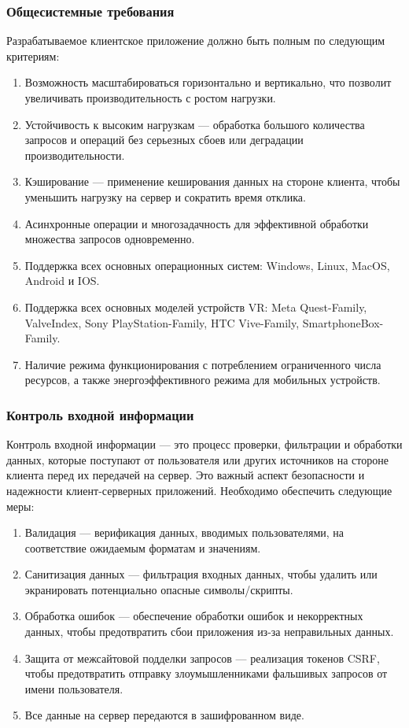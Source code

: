 \documentclass[a4paper,14pt]{extarticle}
\begin{document}
\begin{spacing}{1.5}
\subsubsection{Общесистемные требования}
\hspace{\parindent} Разрабатываемое клиентское приложение должно быть полным по следующим критериям:
\begin{enumerate}[label*=\arabic*.]
    \item Возможность масштабироваться горизонтально и вертикально, что позволит увеличивать производительность с ростом нагрузки.
    \item Устойчивость к высоким нагрузкам --- обработка большого количества запросов и операций без серьезных сбоев или деградации производительности.
    \item Кэширование --- применение кеширования данных на стороне клиента, чтобы уменьшить нагрузку на сервер и сократить время отклика.
    \item Асинхронные операции и многозадачность для эффективной обработки множества запросов одновременно.
    \item Поддержка всех основных операционных систем: Windows, Linux, MacOS, Android и IOS.
    \item {\color{RoyalBlue}Поддержка всех основных моделей устройств VR: Meta Quest-Family, ValveIndex, Sony PlayStation-Family, HTC Vive-Family, SmartphoneBox-Family.}
    \item Наличие режима функционирования с потреблением ограниченного числа ресурсов, а также энергоэффективного режима для мобильных устройств.
\end{enumerate}

\subsubsection{Контроль входной информации}
\hspace{\parindent} Контроль входной информации --- это процесс проверки, фильтрации и обработки данных, которые поступают от пользователя или других источников на стороне клиента перед их передачей на сервер. Это важный аспект безопасности и надежности клиент-серверных приложений. Необходимо обеспечить следующие меры:
\begin{enumerate}[label*=\arabic*.]
    \item Валидация --- верификация данных, вводимых пользователями, на соответствие ожидаемым форматам и значениям.
    \item Санитизация данных --- фильтрация входных данных, чтобы удалить или экранировать потенциально опасные символы/скрипты.
    \item Обработка ошибок --- обеспечение обработки ошибок и некорректных данных, чтобы предотвратить сбои приложения из-за неправильных данных.
    \item Защита от межсайтовой подделки запросов --- реализация токенов CSRF, чтобы предотвратить отправку злоумышленниками фальшивых запросов от имени пользователя.
    \item Все данные на сервер передаются в зашифрованном виде. 
\end{enumerate}


\end{spacing}
\end{document}
